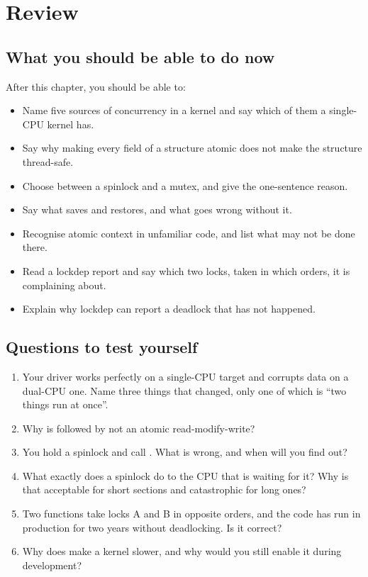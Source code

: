 
\section{Review}
\label{c7:sec:review}

\subsection*{What you should be able to do now}
After this chapter, you should be able to:
\begin{itemize}
  \item Name five sources of concurrency in a kernel and say which of them a single-CPU kernel has.
  \item Say why making every field of a structure atomic does not make the structure thread-safe.
  \item Choose between a spinlock and a mutex, and give the one-sentence reason.
  \item Say what  saves and restores, and what goes wrong without it.
  \item Recognise atomic context in unfamiliar code, and list what may not be done there.
  \item Read a lockdep report and say which two locks, taken in which orders, it is complaining
    about.
  \item Explain why lockdep can report a deadlock that has not happened.
\end{itemize}

\subsection*{Questions to test yourself}
\begin{enumerate}
  \item Your driver works perfectly on a single-CPU target and corrupts data on a dual-CPU one. Name
    three things that changed, only one of which is ``two things run at once''.
  \item Why is  followed by  not an atomic read-modify-write?
  \item You hold a spinlock and call . What is wrong, and when will you
    find out?
  \item What exactly does a spinlock do to the CPU that is waiting for it? Why is that acceptable
    for short sections and catastrophic for long ones?
  \item Two functions take locks A and B in opposite orders, and the code has run in production for
    two years without deadlocking. Is it correct?
  \item Why does  make a kernel slower, and why would you still enable it
    during development?
\end{enumerate}

